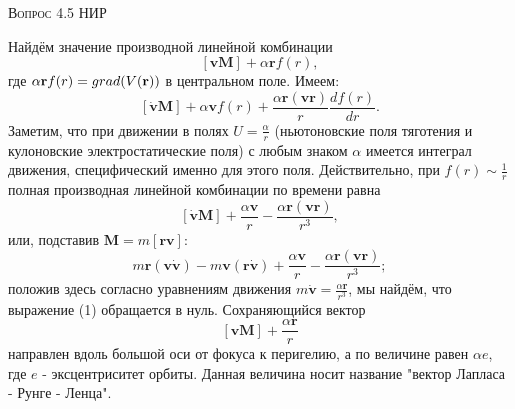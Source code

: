 \documentclass[a4paper, 12pt]{article}
\begin{document}
    \begin{center}
    \textsc{\Large Вопрос 4.5 НИР}\\[0.5cm] 
    \end{center}

    
Найдём значение производной линейной комбинации $$[\textbf{vM}] + \alpha \textbf{r}f(r),$$ где $\alpha \textbf{r}f(r) = grad (V(\textbf r))$ в центральном поле. Имеем:
$$[\mathbf{\dot{v}M}] + {\alpha \textbf{v}}f(r) + \frac {\alpha \textbf{r} (\textbf{vr})}{r}\frac {df(r)}{dr}.$$
Заметим, что при движении в полях $ U = \frac{\alpha}{r}$ (ньютоновские поля тяготения и кулоновские электростатические поля) с любым знаком $\alpha$  имеется интеграл движения, специфический именно для этого поля. 
Действительно, при $f(r) \sim \frac {1}{r}$  полная производная линейной комбинации по времени равна
$$[\mathbf{\dot{v}M}] + \frac {\alpha \textbf{v}}{r} - \frac {\alpha \textbf{r} (\textbf{vr})}{r^3},$$
или, подставив $\textbf{M} = m[\textbf{rv}]:$
$$m\mathbf{r(v\dot{v})} - m\mathbf{v(r\dot{v})} + \frac {\alpha \textbf{v}}{r} - \frac {\alpha \textbf{r} (\textbf{vr})}{r^3};$$
положив здесь согласно уравнениям движения $ m\mathbf{\dot{v}} = \frac {\alpha \textbf{r}}{r^3}$, мы найдём, что выражение (1) обращается в нуль.
Сохраняющийся вектор $$[\textbf{vM}] + \frac {\alpha \textbf{r}}{r}$$ направлен вдоль большой оси от фокуса к перигелию, а по величине равен $\alpha e$, где $e$ - эксцентриситет орбиты. Данная величина носит название "вектор Лапласа - Рунге - Ленца".

    
\end{document}
